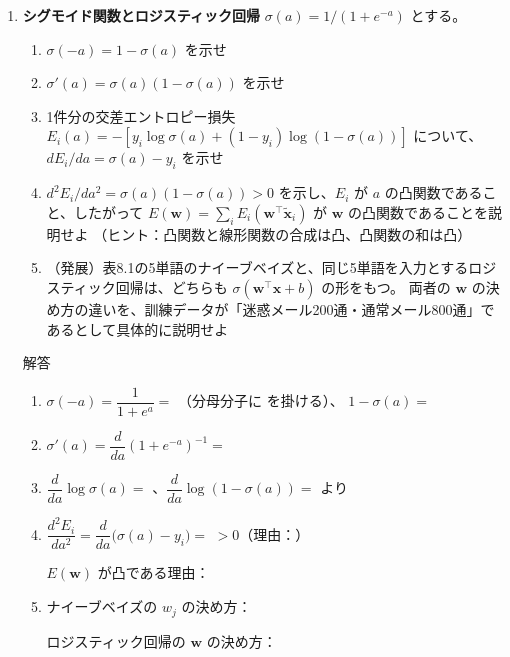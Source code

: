 \documentclass[a4paper,dvipdfmx]{jsarticle}
\newcommand{\提出期限}{2026年11月16日（月）}
\newcommand{\学籍番号}{0000000}
\newcommand{\氏名}{氏名を書く}
\newcommand{\提出日}{2026年11月16日}
\newenvironment{answer}{\begin{itembox}[l]{解答}}{\end{itembox}}
\begin{document}
\begin{enumerate}
  \item \textbf{シグモイド関数とロジスティック回帰}\quad
    $\sigma(a) = 1/(1 + e^{-a})$ とする。
    \begin{enumerate}
      \item $\sigma(-a) = 1 - \sigma(a)$ を示せ
      \item $\sigma'(a) = \sigma(a)(1 - \sigma(a))$ を示せ
      \item 1件分の交差エントロピー損失 $E_i(a) = -[y_i \log\sigma(a) + (1 - y_i)\log(1 - \sigma(a))]$ について、$dE_i/da = \sigma(a) - y_i$ を示せ
      \item $d^2E_i/da^2 = \sigma(a)(1 - \sigma(a)) > 0$ を示し、$E_i$ が $a$ の凸関数であること、したがって $E(\bm{w}) = \sum_i E_i(\bm{w}^\top\tilde{\bm{x}}_i)$ が $\bm{w}$ の凸関数であることを説明せよ
        （ヒント：凸関数と線形関数の合成は凸、凸関数の和は凸）
      \item （発展）表8.1の5単語のナイーブベイズと、同じ5単語を入力とするロジスティック回帰は、どちらも $\sigma(\bm{w}^\top\bm{x} + b)$ の形をもつ。
        両者の $\bm{w}$ の決め方の違いを、訓練データが「迷惑メール200通・通常メール800通」であるとして具体的に説明せよ
    \end{enumerate}
    \begin{answer}
      \begin{enumerate}
        \item $\sigma(-a) = \dfrac{1}{1 + e^{a}} = $ \phantom{XXXXXXXXXXXX}（分母分子に \phantom{XXXX} を掛ける）、\quad
          $1 - \sigma(a) = $ \phantom{XXXXXXXXXXXX}
          \vspace{6mm}
        \item $\sigma'(a) = \dfrac{d}{da}(1 + e^{-a})^{-1} = $ \phantom{XXXXXXXXXXXXXXXX}
          \vspace{10mm}
        \item $\dfrac{d}{da}\log\sigma(a) = $ \phantom{XXXXXXXX}、$\dfrac{d}{da}\log(1 - \sigma(a)) = $ \phantom{XXXXXXXX} より
          \vspace{10mm}
        \item $\dfrac{d^2E_i}{da^2} = \dfrac{d}{da}\bigl(\sigma(a) - y_i\bigr) = $ \phantom{XXXXXXXXXX} $> 0$（理由：\phantom{XXXXXXXXXXXX}）
          \vspace{2mm}

          $E(\bm{w})$ が凸である理由：
          \vspace{12mm}
        \item ナイーブベイズの $w_j$ の決め方：
          \vspace{10mm}

          ロジスティック回帰の $\bm{w}$ の決め方：
          \vspace{10mm}
      \end{enumerate}
    \end{answer}

\end{enumerate}
\end{document}
